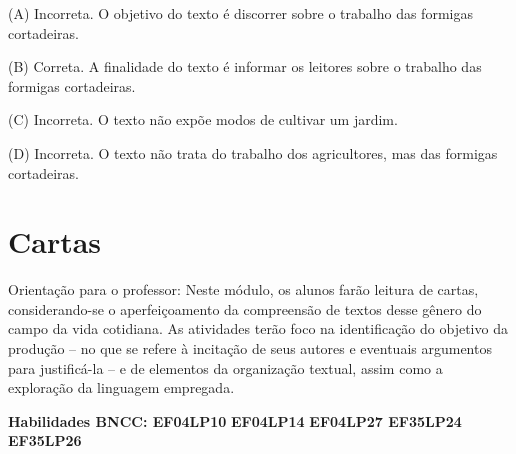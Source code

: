 (A) Incorreta. O objetivo do texto é discorrer sobre o trabalho das
formigas cortadeiras.

(B) Correta. A finalidade do texto é informar os leitores sobre o
trabalho das formigas cortadeiras.

(C) Incorreta. O texto não expõe modos de cultivar um jardim.

(D) Incorreta. O texto não trata do trabalho dos agricultores, mas das
formigas cortadeiras.

\chapter{Cartas}

Orientação para o professor: Neste módulo, os alunos farão leitura de
cartas, considerando-se o aperfeiçoamento da compreensão de textos desse
gênero do campo da vida cotidiana. As atividades terão foco na
identificação do objetivo da produção -- no que se refere à incitação de
seus autores e eventuais argumentos para justificá-la -- e de elementos
da organização textual, assim como a exploração da linguagem empregada.

\textbf{Habilidades BNCC: EF04LP10} \textbf{EF04LP14} \textbf{EF04LP27
EF35LP24 EF35LP26}


